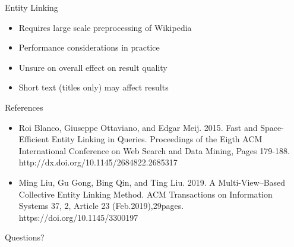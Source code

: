 \documentclass{beamer}
\begin{document}
\begin{frame}{Entity Linking}
	\begin{itemize}
		\item Requires large scale preprocessing of Wikipedia
		\item Performance considerations in practice
		\item Unsure on overall effect on result quality
		\item Short text (titles only) may affect results
	\end{itemize}
\end{frame}

\begin{frame}{References}
	\begin{itemize}
		\item Roi Blanco, Giuseppe Ottaviano, and Edgar Meij. 2015. Fast and Space-Efficient Entity Linking in Queries. Proceedings of the Eigth ACM International Conference on Web Search and Data Mining, Pages 179-188. http://dx.doi.org/10.1145/2684822.2685317
		\item Ming Liu, Gu Gong, Bing Qin, and Ting Liu. 2019. A Multi-View–Based Collective Entity Linking Method. ACM Transactions on Information Systems 37, 2, Article 23 (Feb.2019),29pages. https://doi.org/10.1145/3300197
	\end{itemize}
\end{frame}

\begin{frame}{Questions?}
\end{frame}
\end{document}
